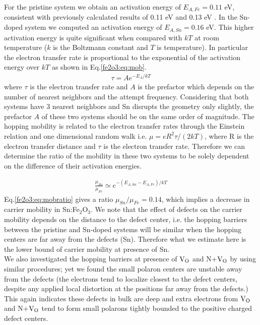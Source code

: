 

For the pristine system we obtain an activation energy of $E_{A,Fe} = 0.11$ eV, consistent with previously calculated results of 0.11 eV \cite{rosso2003an} and 0.13 eV \cite{adelstein2014density}. In the Sn-doped system we computed an activation energy of $E_{A,Sn}=0.16$ eV. This higher activation energy is quite significant when compared with $kT$ at room temperature ($k$ is the Boltzmann constant and $T$ is temperature). In particular the electron transfer rate is proportional to the exponential of the activation energy over $kT$ as shown in Eq.\ref{fe2o3:eq:mob}.
\begin{align}
\tau = A e^{-E_{A}/kT} \label{fe2o3:eq:mob}
\end{align}
where $\tau$ is the electron transfer rate and $A$ is the prefactor which depends on the number of nearest neighbors and the attempt frequency.
Considering that both systems have 3 nearest neighbors and Sn disrupts the geometry only slightly,  the prefactor $A$ of these two systems should be on the same order of magnitude. The hopping mobility is related to the electron transfer rates through the Einstein relation and one dimensional random walk i.e. $\mu=eR^2\tau/(2kT)$, where R is the electron transfer distance and $\tau$ is the electron transfer rate\cite{adelstein2014density,einstein}. Therefore we can determine the ratio of the mobility in these two systems to be solely dependent on the difference of their activation energies.

\begin{align}
\frac{\mu_{Sn}}{\mu_{Fe}} \simeq e^{-(E_{A,Sn}-E_{A,Fe})/kT} \label{fe2o3:eq:mobratio}
\end{align}
Eq.\ref{fe2o3:eq:mobratio} gives a ratio $\mu_{Sn}/\mu_{Fe} = 0.14$, which implies a decrease in carrier mobility in Sn:Fe$_2$O$_3$. We note that the effect of defects on the carrier mobility depends on the distance to the defect center, i.e. the hopping barriers between the pristine and Sn-doped systems will be similar when the hopping centers are far away from the defects (Sn). Therefore what we estimate here is the lower bound of carrier mobility at presence of Sn.\\

We also investigated the hopping barriers at presence of $\text{V}_\text{O}$ and N+$\text{V}_\text{O}$ by using similar procedures; yet we found the small polaron centers are unstable away from the defects (the electrons tend to localize closest to the defect centers, despite any applied local distortion at the positions far away from the defects.) This again indicates these defects in bulk  are deep and extra electrons from  $\text{V}_\text{O}$  and N+$\text{V}_\text{O}$  tend to form small polarons tightly bounded to the positive charged defect centers.

